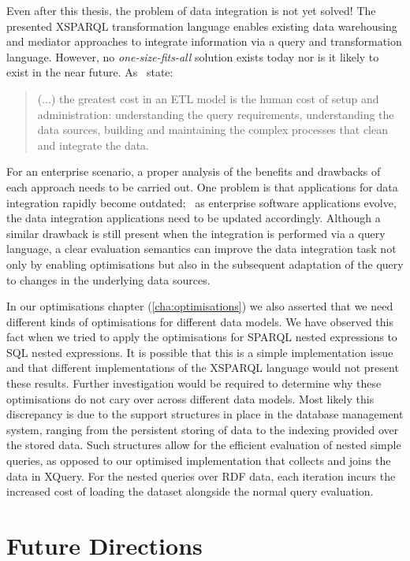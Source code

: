 Even after this thesis, the problem of data integration is not yet solved!
%
The presented XSPARQL transformation language enables existing data warehousing and mediator approaches to integrate
information via a query and transformation language.
%
However, no \emph{one-size-fits-all} solution exists today nor is it likely to exist in the near future. 
%
As~\citet{HalevyAshishBitton:2005aa} state:
\begin{quote}
  (...) the greatest cost in an ETL model is the human cost of setup and administration: understanding the query
  requirements, understanding the data sources, building and maintaining the complex processes that clean and integrate
  the data.
\end{quote}
%
For an enterprise scenario, a proper analysis of the benefits and drawbacks of each approach needs to be carried out.
One problem is that applications for data integration rapidly become outdated; \eg~as enterprise software applications
evolve, the data integration applications need to be updated accordingly.
%
Although a similar drawback is still present when the integration is performed via a query language, a clear evaluation
semantics can improve the data integration task not only by enabling optimisations but also in the subsequent adaptation
of the query to changes in the underlying data sources.


In our optimisations chapter (\cref{cha:optimisations}) we also asserted that we need different kinds of optimisations
for different data models.  We have observed this fact when we tried to apply the optimisations for SPARQL nested
expressions to \ac{SQL} nested expressions.
%
It is possible that this is a simple implementation issue and that different implementations of the XSPARQL language
would not present these results.  Further investigation would be required to determine why these optimisations do not
cary over across different data models.  Most likely this discrepancy is due to the support structures in place in the
database management system, ranging from the persistent storing of data to the indexing provided over the stored data.
Such structures allow for the efficient evaluation of nested simple queries, as opposed to our optimised implementation
that collects and joins the data in XQuery. 
%
For the nested queries over \ac{RDF} data, each iteration incurs the increased cost of loading the dataset alongside the
normal query evaluation.

\section{Future Directions}
\label{sec:future-directions}

